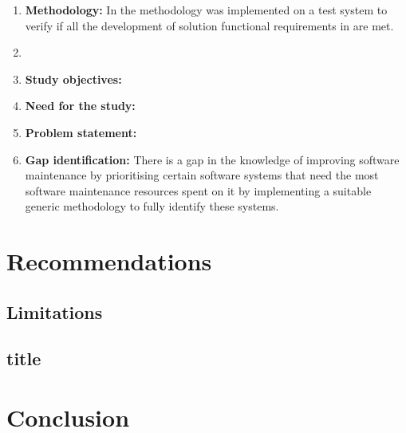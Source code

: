 \begin{enumerate}[label=\textbf{\Roman*.}]
	\item \textbf{Methodology:} In  the methodology was implemented on a test system to verify if all the development of solution functional requirements in  are met.
	\item 
	\item \textbf{Study objectives:} 
	\item \textbf{Need for the study:}
	\item \textbf{Problem statement:}
	\item \textbf{Gap identification:} There is a gap in the knowledge of improving software maintenance by prioritising certain software systems that need the most software maintenance resources spent on it by implementing a suitable generic methodology to fully identify these systems.
\end{enumerate}

\section{Recommendations}

\subsection{Limitations}

\subsection{title}

\section{Conclusion}